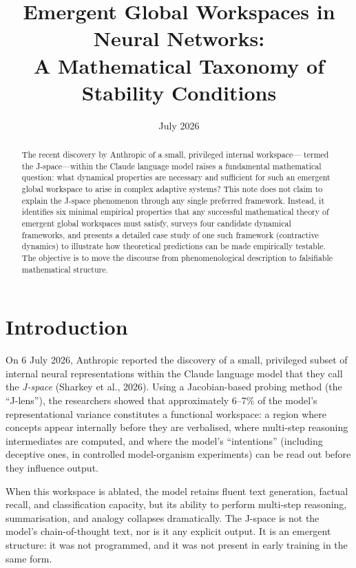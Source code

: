 \documentclass[11pt,a4paper]{article}
\title{\textbf{Emergent Global Workspaces in Neural Networks:}\\
\textbf{A Mathematical Taxonomy of Stability Conditions}}
\author{}
\date{July 2026}
\theoremstyle{definition}
\begin{document}
\maketitle

\begin{abstract}
The recent discovery by Anthropic of a small, privileged internal workspace—
termed the J-space—within the Claude language model raises a fundamental
mathematical question: what dynamical properties are necessary and sufficient
for such an emergent global workspace to arise in complex adaptive systems?
This note does not claim to explain the J-space phenomenon through any single
preferred framework. Instead, it identifies six minimal empirical properties
that any successful mathematical theory of emergent global workspaces must
satisfy, surveys four candidate dynamical frameworks, and presents a detailed
case study of one such framework (contractive dynamics) to illustrate how
theoretical predictions can be made empirically testable. The objective is to
move the discourse from phenomenological description to falsifiable mathematical
structure.
\end{abstract}

\section{Introduction}
\label{sec:intro}

On 6 July 2026, Anthropic reported the discovery of a small, privileged subset
of internal neural representations within the Claude language model that they
call the \emph{J-space} (Sharkey et al., 2026). Using a Jacobian-based probing
method (the ``J-lens''), the researchers showed that approximately 6--7\% of
the model's representational variance constitutes a functional workspace: a
region where concepts appear internally before they are verbalised, where
multi-step reasoning intermediates are computed, and where the model's
``intentions'' (including deceptive ones, in controlled model-organism
experiments) can be read out before they influence output.

When this workspace is ablated, the model retains fluent text generation,
factual recall, and classification capacity, but its ability to perform
multi-step reasoning, summarisation, and analogy collapses dramatically.
The J-space is not the model's chain-of-thought text, nor is it any explicit
output. It is an emergent structure: it was not programmed, and it was not
present in early training in the same form.
\end{document}
